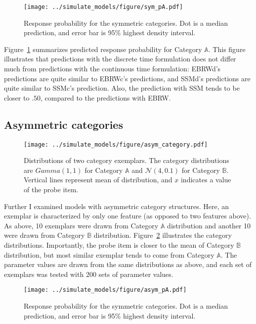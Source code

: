 \documentclass[doc]{apa6}
\begin{document}
\begin{figure}[h!]
    \texttt{[image: ../simulate\_models/figure/sym\_pA.pdf]}

    \caption{Response probability for the symmetric categories. Dot is a median prediction, and
    error bar is 95\% highest density interval.}

\label{fig:sym_pA}
\end{figure}

Figure~\ref{fig:sym_pA} summarizes predicted response probability for Category $\mathbb{A}$. This
figure illustrates that predictions with the discrete time formulation does not differ much from
predictions with the continuous time formulation: EBRWd's predictions are quite similar to EBRWc's
predictions, and SSMd's predictions are quite similar to SSMc's prediction. Also, the prediction
with SSM tends to be closer to $.50$, compared to the predictions with EBRW\@.


\subsection{Asymmetric categories}

\begin{figure}
    \centering
    \texttt{[image: ../simulate\_models/figure/asym\_category.pdf]}

    \caption{Distributions of two category exemplars. The category distributions are $Gamma(1, 1)$
    for Category $\mathbb{A}$ and $\mathcal{N}(4, 0.1)$ for Category $\mathbb{B}$. Vertical lines
    represent mean of distribution, and $x$ indicates a value of the probe item.}

\label{fig:asym_category}
\end{figure}

Further I examined models with asymmetric category structures. Here, an exemplar is characterized by
only one feature (as opposed to two features above). As above, 10 exemplars were drawn from Category
$\mathbb{A}$ distribution and another 10 were drawn from Category $\mathbb{B}$ distribution.
Figure~\ref{fig:asym_category} illustrates the category distributions. Importantly, the probe item
is closer to the mean of Category $\mathbb{B}$ distribution, but most similar exemplar tends to come
from Category $\mathbb{A}$.  The parameter values are drawn from the same distributions as above,
and each set of exemplars was tested with 200 sets of parameter values.

\begin{figure}[h!]
    \texttt{[image: ../simulate\_models/figure/asym\_pA.pdf]}

    \caption{Response probability for the symmetric categories. Dot is a median prediction, and
    error bar is 95\% highest density interval.}

\label{fig:asym_pA}
\end{figure}
\end{document}
